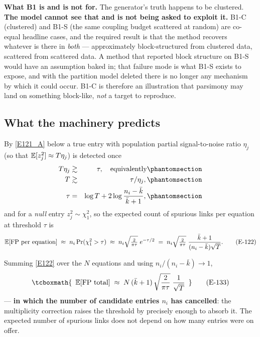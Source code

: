 \begin{recordbox}
\textbf{What B1 is and is not for.} The generator's truth happens to be clustered.
\textbf{The model cannot see that and is not being asked to exploit it.} B1-C
(clustered) and B1-S (the same coupling budget scattered at random) are co-equal
headline cases, and the required result is that the method recovers whatever is there
in \emph{both} --- approximately block-structured from clustered data, scattered from
scattered data. A method that reported block structure on B1-S would have an
assumption baked in; that failure mode is what B1-S exists to expose, and with the
partition model deleted there is no longer any mechanism by which it could occur.
B1-C is therefore an illustration that parsimony may land on something block-like,
\emph{not} a target to reproduce.
\end{recordbox}

\subsection{What the machinery predicts}\label{sec:predict}

By \eqref{E121_A} below a true entry with population partial signal-to-noise ratio
$\eta_j$ (so that $\mathbb{E}[z_j^2]\approx T\eta_j$) is detected once
\begin{eqnarray}
T\eta_j &\gtrsim& \tau, \quad\text{equivalently}
  \Elabel{E-121A}{E121_A} \\
T &\gtrsim& \tau/\eta_j,
  \Elabel{E-121B}{E121_B} \\
\tau &=& \log T + 2\log\frac{n_i-\bar k}{\bar k+1},
  \Elabel{E-121C}{E121_C}
\end{eqnarray}
and for a \emph{null} entry $z_j^2\sim\chi^2_1$, so the expected count of spurious
links per equation at threshold $\tau$ is
\begin{equation}
\mathbb{E}[\text{FP per equation}] \;\approx\; n_i\Pr(\chi^2_1>\tau) \;\approx\;
n_i\sqrt{\tfrac{2}{\pi\tau}}\;e^{-\tau/2} \;=\;
n_i\sqrt{\tfrac{2}{\pi\tau}}\;\frac{\bar k+1}{(n_i-\bar k)\sqrt{T}}.
\tag{E-122}\label{E122}
\end{equation}

\begin{corollary}\label{cor:headline}
Summing \eqref{E122} over the $N$ equations and using $n_i/(n_i-\bar k)\to1$,
\begin{equation}
\tcboxmath{ \begin{array}[t]{c}
\E[\text{FP total}] \;\approx\; N\,(\bar k+1)\,\sqrt{\dfrac{2}{\pi\tau}}\;
\dfrac{1}{\sqrt{T}}
\end{array}}
\tag{E-133}\label{E133}
\end{equation}
--- \textbf{in which the number of candidate entries $n_i$ has cancelled}: the
multiplicity correction raises the threshold by precisely enough to absorb it. The
expected number of spurious links does not depend on how many entries were on offer.
\end{corollary}

